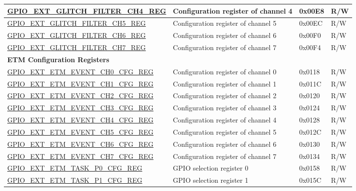 \begin{longtable}{ | p{5.9cm} | p{6.8cm} | p{1.3cm} | p{1.9cm} | }
\hyperref[regdesc:GPIOEXTGLITCHFILTERCHNREG]{GPIO\_EXT\_GLITCH\_FILTER\_CH4\_REG} & Configuration register of channel 4 & 0x00E8 & R/W \\ \hline
\hyperref[regdesc:GPIOEXTGLITCHFILTERCHNREG]{GPIO\_EXT\_GLITCH\_FILTER\_CH5\_REG} & Configuration register of channel 5 & 0x00EC & R/W \\ \hline
\hyperref[regdesc:GPIOEXTGLITCHFILTERCHNREG]{GPIO\_EXT\_GLITCH\_FILTER\_CH6\_REG} & Configuration register of channel 6 & 0x00F0 & R/W \\ \hline
\hyperref[regdesc:GPIOEXTGLITCHFILTERCHNREG]{GPIO\_EXT\_GLITCH\_FILTER\_CH7\_REG} & Configuration register of channel 7 & 0x00F4 & R/W \\ \hline
\multicolumn{4}{|l|}{\textbf{ETM Configuration Registers}} \\ \hline
\hyperref[regdesc:GPIOEXTETMEVENTCHNCFGREG]{GPIO\_EXT\_ETM\_EVENT\_CH0\_CFG\_REG} & Configuration register of channel 0 & 0x0118 & R/W \\ \hline
\hyperref[regdesc:GPIOEXTETMEVENTCHNCFGREG]{GPIO\_EXT\_ETM\_EVENT\_CH1\_CFG\_REG} & Configuration register of channel  1 & 0x011C & R/W \\ \hline
\hyperref[regdesc:GPIOEXTETMEVENTCHNCFGREG]{GPIO\_EXT\_ETM\_EVENT\_CH2\_CFG\_REG} & Configuration register of channel 2 & 0x0120 & R/W \\ \hline
\hyperref[regdesc:GPIOEXTETMEVENTCHNCFGREG]{GPIO\_EXT\_ETM\_EVENT\_CH3\_CFG\_REG} & Configuration register of channel 3 & 0x0124 & R/W \\ \hline
\hyperref[regdesc:GPIOEXTETMEVENTCHNCFGREG]{GPIO\_EXT\_ETM\_EVENT\_CH4\_CFG\_REG} & Configuration register of channel 4 & 0x0128 & R/W \\ \hline
\hyperref[regdesc:GPIOEXTETMEVENTCHNCFGREG]{GPIO\_EXT\_ETM\_EVENT\_CH5\_CFG\_REG} & Configuration register of channel 5 & 0x012C & R/W \\ \hline
\hyperref[regdesc:GPIOEXTETMEVENTCHNCFGREG]{GPIO\_EXT\_ETM\_EVENT\_CH6\_CFG\_REG} & Configuration register of channel 6 & 0x0130 & R/W \\ \hline
\hyperref[regdesc:GPIOEXTETMEVENTCHNCFGREG]{GPIO\_EXT\_ETM\_EVENT\_CH7\_CFG\_REG} & Configuration register of channel 7 & 0x0134 & R/W \\ \hline
\hyperref[regdesc:GPIOEXTETMTASKP0CFGREG]{GPIO\_EXT\_ETM\_TASK\_P0\_CFG\_REG} & GPIO selection register 0 & 0x0158 & R/W \\ \hline
\hyperref[regdesc:GPIOEXTETMTASKP1CFGREG]{GPIO\_EXT\_ETM\_TASK\_P1\_CFG\_REG} & GPIO selection register 1 & 0x015C & R/W \\ \hline

\end{longtable}
